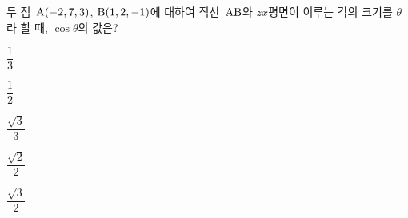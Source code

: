 두 점~$\mathrm{A}(-2{,}\mkern3mu\mathopen{}7{,}\mkern3mu\mathopen{}3)$, $\mathrm{B}(1{,}\mkern3mu\mathopen{}2{,}\mkern3mu\mathopen{}-1)$에 대하여 직선~$\mathrm{AB}$와 $zx$평면이 이루는 각의 크기를 $\theta$라 할 때, $\cos\theta$의 값은?
\begin{choices32}{\rule[-3ex]{0pt}{8ex}$\dfrac{1}{3}$}{\rule[-3ex]{0pt}{8ex}$\dfrac{1}{2}$}{\rule[-3ex]{0pt}{8ex}$\dfrac{\sqrt{3}}{3}$}{\rule[-3ex]{0pt}{8ex}$\dfrac{\sqrt{2}}{2}$}{\rule[-3ex]{0pt}{8ex}$\dfrac{\sqrt{3}}{2}$}\end{choices32}
